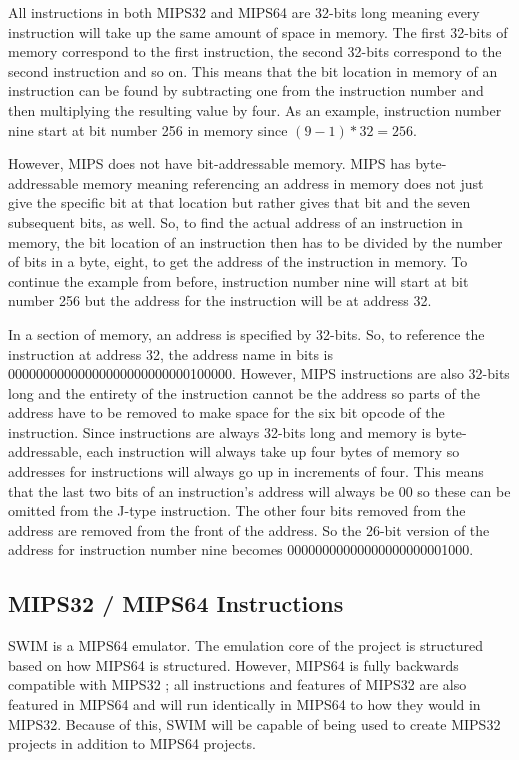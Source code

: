 \documentclass[
    parskip=half,
    fontsize=12pt,
    titlepage=firstiscover,
    toc=bibliography,
    numbers=endperiod
]{scrartcl}
\begin{document}
All instructions in both MIPS32 and MIPS64 are 32-bits long \cite{brady-instruction-formats} meaning
every instruction will take up the same amount of space in memory. The
first 32-bits of memory correspond to the first instruction, the second
32-bits correspond to the second instruction and so on. This means that
the bit location in memory of an instruction can be found by subtracting
one from the instruction number and then multiplying the resulting value
by four. As an example, instruction number nine start at bit number 256
in memory since ${{({9 - 1})} \ast 32} = 256.$

However, MIPS does not have bit-addressable \cite{sciencedirect-addressable-memory} memory. MIPS has
byte-addressable memory meaning referencing an address in memory does
not just give the specific bit at that location but rather gives that
bit and the seven subsequent bits, as well. So, to find the actual
address of an instruction in memory, the bit location of an instruction
then has to be divided by the number of bits in a byte, eight, to get
the address of the instruction in memory. To continue the example from
before, instruction number nine will start at bit number 256 but the
address for the instruction will be at address 32.

In a section of memory, an address is specified by 32-bits. So, to
reference the instruction at address 32, the address name in bits is
00000000000000000000000000100000. However, MIPS instructions are also
32-bits long and the entirety of the instruction cannot be the address
so parts of the address have to be removed to make space for the six bit
opcode of the instruction. Since instructions are always 32-bits long
and memory is byte-addressable, each instruction will always take up
four bytes of memory so addresses for instructions will always go up in
increments of four. This means that the last two bits of an
instruction's address will always be 00 so these can be omitted from the
J-type instruction. The other four bits removed from the address are
removed from the front of the address. So the 26-bit version of the
address for instruction number nine becomes 00000000000000000000001000.

\subsection{MIPS32 / MIPS64 Instructions}

SWIM is a MIPS64 emulator. The emulation core of the project is
structured based on how MIPS64 is structured. However, MIPS64 is fully
backwards compatible with MIPS32 \cite{mips-specification}; all instructions and features of
MIPS32 are also featured in MIPS64 and will run identically in MIPS64 to
how they would in MIPS32. Because of this, SWIM will be capable of being
used to create MIPS32 projects in addition to MIPS64 projects.
\end{document}
